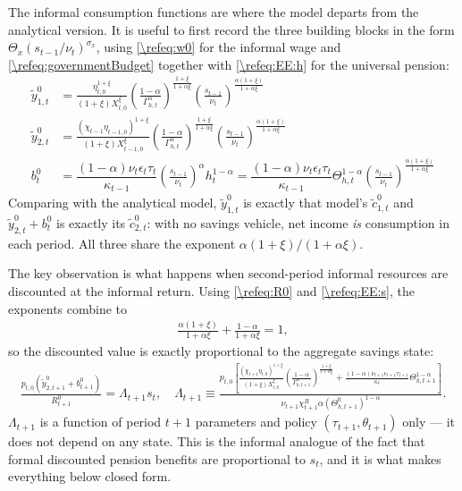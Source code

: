 \documentclass[a4paper]{article}
\begin{document}
The informal consumption functions are where the model departs from the analytical version. It is useful to first record the three building blocks in the form $\Theta_x(s_{t-1}/\nu_t)^{\sigma_x}$, using \eqref{\refeq:w0} for the informal wage and \eqref{\refeq:governmentBudget} together with \eqref{\refeq:EE:h} for the universal pension:
\begin{subequations}\label{\refeq:EE:y0}
\begin{align}
    \tilde{y}_{1,t}^0 &= \frac{\eta_{t,0}^{1+\xi}}{(1+\xi)X_{t,0}^{\xi}}\left(\frac{1-\alpha}{\Gamma_{h,t}^{\alpha}}\right)^{\frac{1+\xi}{1+\alpha\xi}}\left(\frac{s_{t-1}}{\nu_t}\right)^{\frac{\alpha(1+\xi)}{1+\alpha\xi}} \\
    \tilde{y}_{2,t}^0 &= \frac{\left(\chi_{t-1}\eta_{t-1,0}\right)^{1+\xi}}{(1+\xi)X_{t-1,0}^{\xi}}\left(\frac{1-\alpha}{\Gamma_{h,t}^{\alpha}}\right)^{\frac{1+\xi}{1+\alpha\xi}}\left(\frac{s_{t-1}}{\nu_t}\right)^{\frac{\alpha(1+\xi)}{1+\alpha\xi}} \\
    b_t^0 &= \dfrac{(1-\alpha)\nu_t\epsilon_t\tau_t}{\kappa_{t-1}}\left(\frac{s_{t-1}}{\nu_t}\right)^{\alpha}h_t^{1-\alpha} = \dfrac{(1-\alpha)\nu_t\epsilon_t\tau_t}{\kappa_{t-1}}\Theta_{h,t}^{1-\alpha}\left(\frac{s_{t-1}}{\nu_t}\right)^{\frac{\alpha(1+\xi)}{1+\alpha\xi}}
\end{align}
\end{subequations}
Comparing with the analytical model, $\tilde{y}_{1,t}^0$ is exactly that model's $\tilde{c}_{1,t}^0$ and $\tilde{y}_{2,t}^0+b_t^0$ is exactly its $\tilde{c}_{2,t}^0$: with no savings vehicle, net income \emph{is} consumption in each period. All three share the exponent $\alpha(1+\xi)/(1+\alpha\xi)$.

The key observation is what happens when second-period informal resources are discounted at the informal return. Using \eqref{\refeq:R0} and \eqref{\refeq:EE:s}, the exponents combine to
\begin{align*}
    \frac{\alpha(1+\xi)}{1+\alpha\xi}+\frac{1-\alpha}{1+\alpha\xi} = 1,
\end{align*}
so the discounted value is exactly proportional to the aggregate savings state:
\begin{align}\label{\refeq:EE:Lambda}
    \frac{p_{t,0}\left(\tilde{y}_{2,t+1}^0+b_{t+1}^0\right)}{R_{t+1}^0} = \Lambda_{t+1}s_t, \quad \Lambda_{t+1}\equiv\frac{p_{t,0}\left[\frac{(\chi_{t+1}\eta_{t,0})^{1+\xi}}{(1+\xi)X_{t,0}^{\xi}}\left(\frac{1-\alpha}{\Gamma_{h,t+1}^{\alpha}}\right)^{\frac{1+\xi}{1+\alpha\xi}}+\frac{(1-\alpha)\nu_{t+1}\epsilon_{t+1}\tau_{t+1}}{\kappa_t}\Theta_{h,t+1}^{1-\alpha}\right]}{\nu_{t+1}\chi_{t+1}^R\alpha\left(\Theta_{h,t+1}^0\right)^{1-\alpha}}.
\end{align}
$\Lambda_{t+1}$ is a function of period $t+1$ parameters and policy $(\tau_{t+1},\theta_{t+1})$ only --- it does not depend on any state. This is the informal analogue of the fact that formal discounted pension benefits are proportional to $s_t$, and it is what makes everything below closed form.
\end{document}
